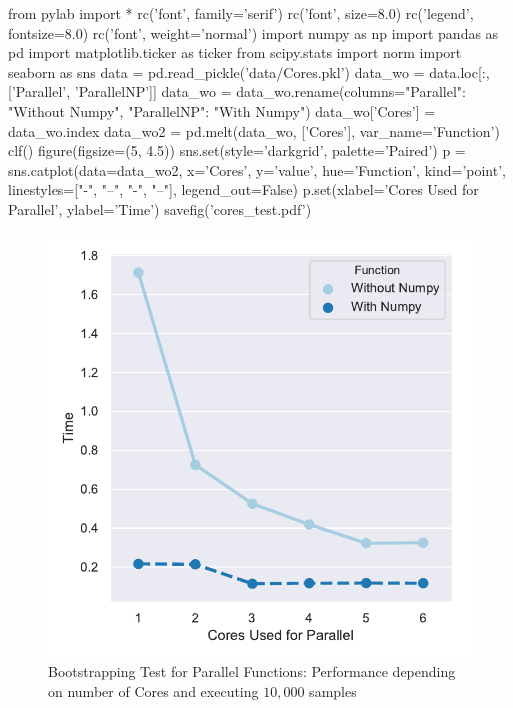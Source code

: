 \documentclass[11pt]{article}
\begin{document}
\begin{pycode}
from pylab import *
rc('font', family='serif')
rc('font', size=8.0)
rc('legend', fontsize=8.0)
rc('font', weight='normal')
import numpy as np
import pandas as pd
import matplotlib.ticker as ticker
from scipy.stats import norm
import seaborn as sns
data = pd.read_pickle('data/Cores.pkl')
data_wo = data.loc[:, ['Parallel', 'ParallelNP']]
data_wo = data_wo.rename(columns={"Parallel": "Without Numpy", "ParallelNP": "With Numpy"})
data_wo['Cores'] = data_wo.index
data_wo2 = pd.melt(data_wo, ['Cores'], var_name='Function')
clf()
figure(figsize=(5, 4.5))
sns.set(style='darkgrid', palette='Paired')
p = sns.catplot(data=data_wo2, x='Cores', y='value', hue='Function', kind='point', linestyles=["-", "--", "-", "--"],
                legend_out=False)
p.set(xlabel='Cores Used for Parallel', ylabel='Time')
savefig('cores_test.pdf')
\end{pycode}

\begin{figure}[H]
    \begin{center}
        \includegraphics{cores_test.pdf}
    \end{center}
    \caption{Bootstrapping Test for Parallel Functions: Performance depending on number of Cores and executing $10,000$ samples}\label{fig:CoresTest}
\end{figure}
\end{document}
